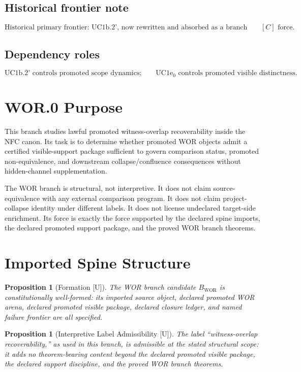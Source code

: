 \documentclass[11pt]{article}
\newtheorem{proposition}[theorem]{Proposition}
\theoremstyle{definition}
\theoremstyle{remark}
\newcommand{\U}{\textnormal{[U]}}
\newcommand{\WOR}{\mathrm{WOR}}
\begin{document}
\subsection*{Historical frontier note}
\[
\boxed{
\text{Historical primary frontier: UC1b.2', now rewritten and absorbed as a branch theorem at }[C]\text{ force.}
}
\]

\subsection*{Dependency roles}
\[
\boxed{
\text{UC1b.2' controls promoted scope dynamics;}
\qquad
\text{UC1e}_0\text{ controls promoted visible distinctness.}
}
\]

\section{WOR.0 Purpose}

This branch studies lawful promoted witness-overlap recoverability inside the NFC canon. Its task is to determine whether promoted WOR objects admit a certified visible-support package sufficient to govern comparison status, promoted non-equivalence, and downstream collapse/confluence consequences without hidden-channel supplementation.

The WOR branch is structural, not interpretive. It does not claim source-equivalence with any external comparison program. It does not claim project-collapse identity under different labels. It does not license undeclared target-side enrichment. Its force is exactly the force supported by the declared spine imports, the declared promoted support package, and the proved WOR branch theorems.

\section{Imported Spine Structure}

\begin{proposition}[Formation {\U}]
The WOR branch candidate \(B_{\WOR}\) is constitutionally well-formed: its imported source object, declared promoted WOR arena, declared promoted visible package, declared closure ledger, and named failure frontier are all specified.
\end{proposition}

\begin{proposition}[Interpretive Label Admissibility {\U}]
The label ``witness-overlap recoverability,'' as used in this branch, is admissible at the stated structural scope: it adds no theorem-bearing content beyond the declared promoted visible package, the declared support discipline, and the proved WOR branch theorems.
\end{proposition}
\end{document}
